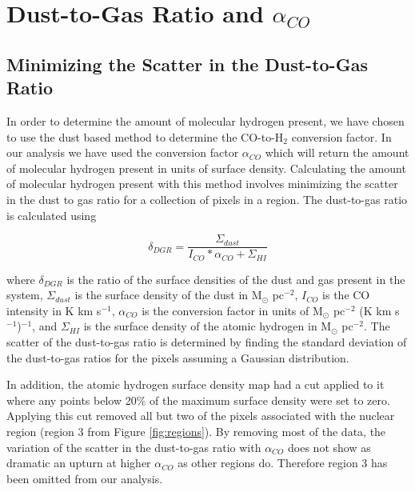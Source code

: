 \chapter{Dust-to-Gas Ratio and $\alpha_{CO}$}

\section{Minimizing the Scatter in the Dust-to-Gas Ratio}

In order to determine the amount of molecular hydrogen present, we have chosen to use the dust based method to determine the CO-to-H$_2$ conversion factor.  In our analysis we have used the conversion factor $\alpha_{CO}$ which will return the amount of molecular hydrogen present in units of surface density.  Calculating the amount of molecular hydrogen present with this method involves minimizing the scatter in the dust to gas ratio for a collection of pixels in a region.  The dust-to-gas ratio is calculated using

\begin{equation}\label{eq:dgr}
  \delta_{DGR} = \frac{\Sigma_{dust}}{I_{CO}*\alpha_{CO} + \Sigma_{HI}}
\end{equation}

\noindent where $\delta_{DGR}$ is the ratio of the surface densities of the dust and gas present in the system, $\Sigma_{dust}$ is the surface density of the dust in M$_\odot$ pc$^{-2}$, $I_{CO}$ is the CO intensity in K km s$^{-1}$, $\alpha_{CO}$ is the conversion factor in units of M$_\odot$ pc$^{-2}$ (K km s$^{-1}$)$^{-1}$, and $\Sigma_{HI}$ is the surface density of the atomic hydrogen in M$_\odot$ pc$^{-2}$.  The scatter of the dust-to-gas ratio is determined by finding the standard deviation of the dust-to-gas ratios for the pixels assuming a Gaussian distribution.  

In addition, the atomic hydrogen surface density map had a cut applied to it where any points below 20\% of the maximum surface density were set to zero.  Applying this cut removed all but two of the pixels associated with the nuclear region (region 3 from Figure \ref{fig:regions}).  By removing most of the data, the variation of the scatter in the dust-to-gas ratio with $\alpha_{CO}$ does not show as dramatic an upturn at higher $\alpha_{CO}$ as other regions do.  Therefore region 3 has been omitted from our analysis.

